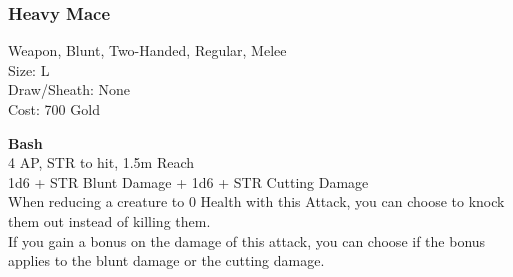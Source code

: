 \subsubsection{Heavy Mace}\label{weapon:heavyMace}
Weapon, Blunt, Two-Handed, Regular, Melee\\
Size: L\\
Draw/Sheath: None\\
Cost: 700 Gold

\textbf{Bash}\\
4 AP, STR to hit, 1.5m Reach\\
1d6 + \texttimes STR Blunt Damage + 1d6 + \texttimes STR Cutting Damage\\
When reducing a creature to 0 Health with this Attack, you can choose to knock them out instead of killing them.\\
If you gain a bonus on the damage of this attack, you can choose if the bonus applies to the blunt damage or the cutting damage.